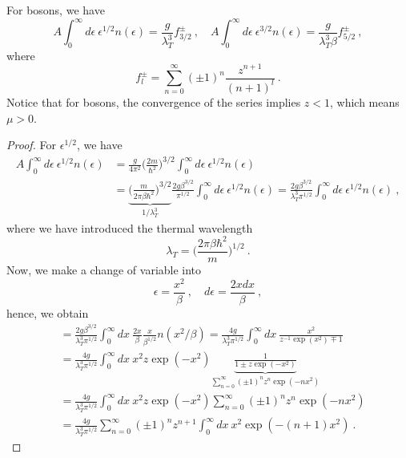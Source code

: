     For bosons, we have
    \begin{equation}\label{ser}
        A \int_0^\infty d\epsilon ~ \epsilon^{1/2} n(\epsilon) = \frac{g}{\lambda_T^3} f_{3/2}^\pm ~, \quad A \int_0^\infty d\epsilon ~ \epsilon^{3/2} n(\epsilon) = \frac{g}{\lambda_T^3 \beta} f_{5/2}^{\pm} ~,
    \end{equation}
    where 
    \begin{equation}\label{ser2}
        f_l^\pm = \sum_{n=0}^\infty (\pm 1)^n \frac{z^{n+1}}{(n+1)^l} ~.
    \end{equation}
    Notice that for bosons, the convergence of the series implies $z < 1$, which means $\mu > 0$.
    \begin{proof}
        For $\epsilon^{1/2}$, we have 
        \begin{equation*}
        \begin{aligned}
            A \int_0^\infty d\epsilon ~ \epsilon^{1/2} n(\epsilon) & = \frac{g}{4 \pi^2} \Big(\frac{2m}{\hbar^2} \Big)^{3/2} \int_0^\infty d\epsilon ~ \epsilon^{1/2} n(\epsilon) \\ & = \underbrace{\Big ( \frac{m}{2 \pi \beta \hbar^2} \Big)^{3/2}}_{1 / \lambda_T^3} \frac{2 g \beta^{3/2}}{\pi^{1/2}} \int_0^\infty d\epsilon ~ \epsilon^{1/2} n(\epsilon)  = \frac{2 g \beta^{3/2}}{\lambda_T^3 \pi^{1/2}} \int_0^\infty d\epsilon ~ \epsilon^{1/2} n(\epsilon) ~,
        \end{aligned}
        \end{equation*}
        where we have introduced the thermal wavelength
        \begin{equation*}
            \lambda_T = \Big (\frac{2 \pi \beta \hbar^2}{m} \Big)^{1/2} ~.
        \end{equation*} 
        Now, we make a change of variable into
        \begin{equation*}
            \epsilon = \frac{x^2}{\beta} ~, \quad d \epsilon = \frac{2 x dx}{\beta} ~,
        \end{equation*}
        hence, we obtain 
        \begin{equation*}
        \begin{aligned}
            & = \frac{2 g \beta^{3/2}}{\lambda_T^3 \pi^{1/2}} \int_0^\infty dx ~ \frac{2 x}{\beta} \frac{x}{\beta^{1/2}} n(x^2 / \beta) = \frac{4 g}{\lambda_T^3 \pi^{1/2}} \int_0^\infty dx ~ \frac{x^2}{z^{-1} \exp(x^2) \mp 1} \\ & = \frac{4 g}{\lambda_T^3 \pi^{1/2}} \int_0^\infty dx ~ x^2 z \exp(-x^2) \underbrace{\frac{1}{1 \pm z \exp(-x^2)}}_{\sum_{n=0}^\infty (\pm 1)^n z^n \exp(-n x^2)} \\ & = \frac{4 g}{\lambda_T^3 \pi^{1/2}} \int_0^\infty dx ~ x^2 z \exp(-x^2) \sum_{n=0}^\infty (\pm 1)^n z^n \exp(-n x^2) \\ & = \frac{4 g}{\lambda_T^3 \pi^{1/2}} \sum_{n=0}^\infty (\pm 1)^n z^{n+1} \int_0^\infty dx ~ x^2 \exp(-(n + 1) x^2) ~.

\end{aligned}
\end{equation*}
\end{proof}
